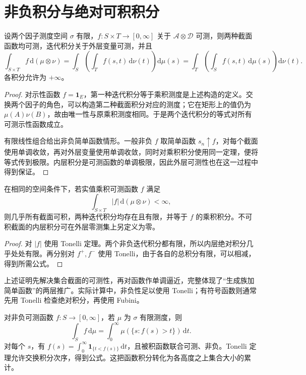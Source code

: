\documentclass[UTF8,12pt,a4paper,fontset=fandol]{ctexbook}
\begin{document}
\section{非负积分与绝对可积积分}
\begin{theorem}[Tonelli 定理]
设两个因子测度空间 $\sigma$ 有限，$f:S\times T\to[0,\infty]$ 关于 $\mathcal A\otimes\mathcal D$ 可测，则两种截面函数均可测，迭代积分关于外层变量可测，并且
\begin{equation}
 \int_{S\times T}f\,\mathrm d(\mu\otimes\nu)
 =\int_S\left(\int_T f(s,t)\,\mathrm d\nu(t)\right)\mathrm d\mu(s)
 =\int_T\left(\int_S f(s,t)\,\mathrm d\mu(s)\right)\mathrm d\nu(t).
 \label{eq:mt-tonelli}
\end{equation}
各积分允许为 $+\infty$。
\label{thm:mt-tonelli}
\end{theorem}
\begin{proof}
对示性函数 $f=\mathbf1_E$，第一种迭代积分等于乘积测度是上述构造的定义。交换两个因子的角色，可以构造第二种截面积分对应的测度；它在矩形上的值仍为 $\mu(A)\nu(B)$，故由唯一性与原乘积测度相同。于是两个迭代积分的等式对所有可测示性函数成立。

有限线性组合给出非负简单函数情形。一般非负 $f$ 取简单函数 $s_n\uparrow f$，对每个截面使用单调收敛，再对外层变量使用单调收敛，同时对乘积积分使用同一定理，便将等式传到极限。内层积分是可测函数的单调极限，因此外层可测性也在这一过程中得到保证。
\end{proof}

\begin{theorem}[Fubini 定理]
在相同的空间条件下，若实值乘积可测函数 $f$ 满足
\[
 \int_{S\times T}|f|\,\mathrm d(\mu\otimes\nu)<\infty,
\]
则几乎所有截面可积，两种迭代积分均存在且有限，并等于 $f$ 的乘积积分。不可积截面的内层积分可在外层零测集上另定义为零。
\label{thm:mt-fubini}
\end{theorem}
\begin{proof}
对 $|f|$ 使用 Tonelli 定理。两个非负迭代积分都有限，所以内层绝对积分几乎处处有限。再分别对 $f^+,f^-$ 使用 Tonelli，由于各自的总积分有限，可以相减，得到所需公式。
\end{proof}
上述证明先解决集合截面的可测性，再对函数作单调逼近，完整体现了“生成族加简单函数”的两层推广。实际计算中，非负性足以使用 Tonelli；有符号函数则通常先用 Tonelli 检查绝对积分，再使用 Fubini。

\begin{example}[由水平集表示积分]
对非负可测函数 $f:S\to[0,\infty]$，若 $\mu$ 为 $\sigma$ 有限测度，则
\begin{equation}
 \int_S f\,\mathrm d\mu
 =\int_0^\infty\mu(\{s:f(s)>t\})\,\mathrm dt.
 \label{eq:mt-layer-cake}
\end{equation}
对每个 $s$，有 $f(s)=\int_0^\infty\mathbf1_{\{t<f(s)\}}\,\mathrm dt$，且被积函数联合可测、非负。Tonelli 定理允许交换积分次序，得到公式。这把函数积分转化为各高度之上集合大小的累计。
\end{example}
\end{document}
